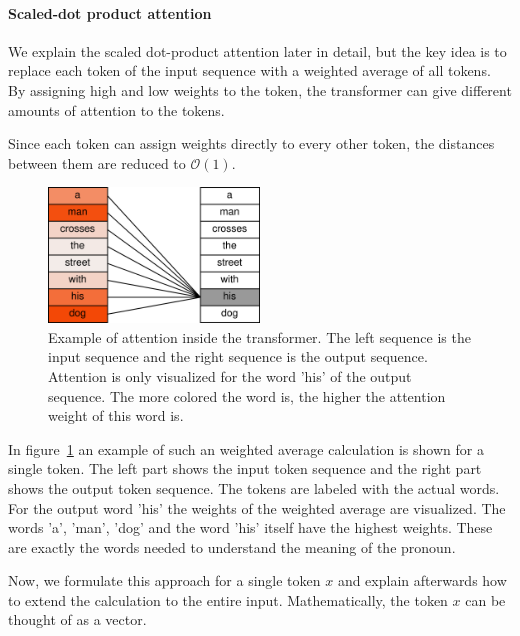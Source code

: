 \documentclass[a4paper]{scrartcl}
\begin{document}
    \paragraph{Scaled-dot product attention}
    We explain the scaled dot-product attention later in detail, but the key idea is to replace each token of the input sequence with a weighted average of all tokens.
    By assigning high and low weights to the token, the transformer can give different amounts of attention to the tokens.

    Since each token can assign weights directly to every other token, the distances between them are reduced to $\mathcal{O}(1)$.

    \begin{figure}[btp]
        \centering
        \includegraphics[width=0.5\textwidth]{img/TransformerAttentionExample}
        \caption[Example of attention inside the transformer]{Example of attention inside the transformer.
        The left sequence is the input sequence and the right sequence is the output sequence.
        Attention is only visualized for the word 'his' of the output sequence.
        The more colored the word is, the higher the attention weight of this word is.
        }
        \label{fig:transformer-attention-example}
    \end{figure}

    In figure~\ref{fig:transformer-attention-example} an example of such an weighted average calculation is shown for a single token.
    The left part shows the input token sequence and the right part shows the output token sequence.
    The tokens are labeled with the actual words.
    For the output word 'his' the weights of the weighted average are visualized.
    The words 'a', 'man', 'dog' and the word 'his' itself have the highest weights.
    These are exactly the words needed to understand the meaning of the pronoun.

    Now, we formulate this approach for a single token $x$ and explain afterwards how to extend the calculation to the entire input.
    Mathematically, the token $x$ can be thought of as a vector.
\end{document}
